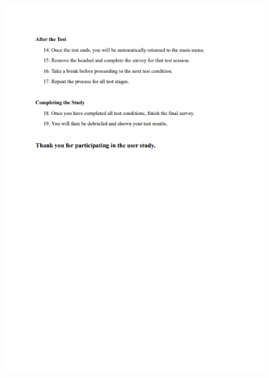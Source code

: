 \documentclass{l4proj}
\begin{document}
\begin{appendices}
\begin{figure}
    \centering
    \includegraphics[width=1\linewidth]{images//VFT study/p5.png}
\end{figure}
\clearpage


\end{appendices}
\end{document}

